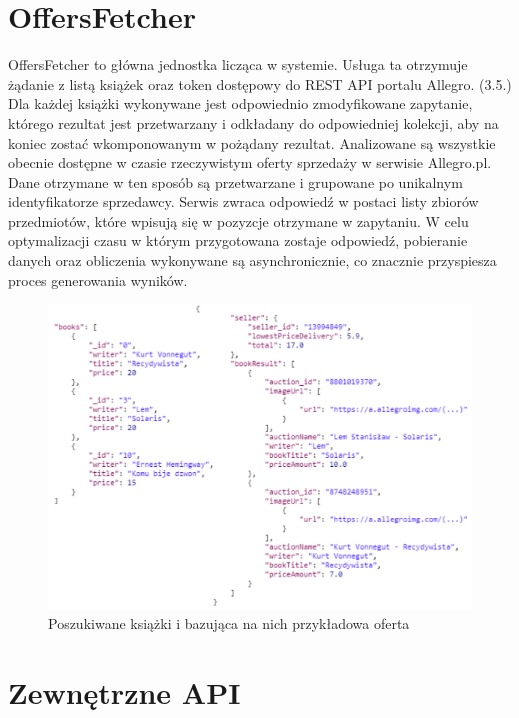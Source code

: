 \section{OffersFetcher}
OffersFetcher to główna jednostka licząca w systemie. Usługa ta otrzymuje żądanie z listą książek oraz token dostępowy do REST API portalu Allegro. (3.5.)
Dla każdej książki wykonywane jest odpowiednio zmodyfikowane zapytanie, którego rezultat jest przetwarzany i odkładany do odpowiedniej kolekcji, aby na koniec zostać wkomponowanym w pożądany rezultat. Analizowane są wszystkie obecnie dostępne w czasie rzeczywistym oferty sprzedaży w serwisie Allegro.pl. \\Dane otrzymane w ten sposób są przetwarzane i grupowane po unikalnym identyfikatorze sprzedawcy. Serwis zwraca odpowiedź w postaci listy zbiorów przedmiotów, które wpisują się w pozyzcje otrzymane w zapytaniu. W celu optymalizacji czasu w którym przygotowana zostaje odpowiedź, pobieranie danych oraz obliczenia wykonywane są asynchronicznie, co znacznie przyspiesza proces generowania wyników.
\begin{figure}[H]
	\centering
	\includegraphics[width=\linewidth]{booksToOffers.pdf}
	\caption{Poszukiwane książki i bazująca na nich przykładowa oferta}
\end{figure}

\section{Zewnętrzne API}

